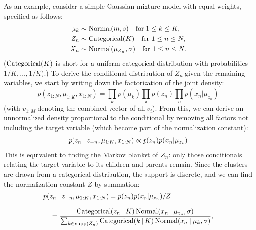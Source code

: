 As an example, consider a simple Gaussian mixture model with equal weights, specified as follows:
\begin{equation}
  \label{eq:normal-mixture-1}
  \begin{aligned}
    \mu_{k} &\sim \mathrm{Normal}(m, s) \quad\text{for } 1 \le k \le K, \\
    Z_{n} &\sim \mathrm{Categorical}(K) \quad\text{for } 1 \le n \le N, \\
    X_{n} &\sim \mathrm{Normal}(\mu_{Z_{n}}, \sigma) \quad\text{for } 1 \le n \le N.
  \end{aligned}
\end{equation}
(\(\mathrm{Categorical}(K)\) is short for a uniform categorical distribution with probabilities
\(1/K, \ldots, 1/K)\).)  To derive the conditional distribution of \(Z_{n}\) given the remaining
variables, we start by writing down the factorization of the joint density:
\begin{equation}
  p(z_{1:N}, \mu_{1:K}, x_{1:N}) = \prod_{k} p(\mu_{k}) \prod_{n} p(z_{n}) \prod_{n} p(x_{n} | \mu_{z_{n}})
\end{equation}
(with \(v_{1:M}\) denoting the combined vector of all \(v_{i}\)). From this, we can derive an
unnormalized density proportional to the conditional by removing all factors not including the
target variable (which become part of the normalization constant):
\begin{equation}
    p(z_{n} \:\vert\: z_{-n}, \mu_{1:K}, x_{1:N}) \propto p(z_{n}) p(x_{n} | \mu_{z_{n}})
\end{equation}
This is equivalent to finding the Markov blanket of \(Z_{n}\): only those conditionals relating the
target variable to its children and parents remain.  Since the clusters are drawn from a categorical
distribution, the support is discrete, and we can find the normalization constant \(Z\) by
summation:
\begin{equation}
  \setlength{\jot}{0.8\baselineskip}
  \begin{aligned}
    &p(z_{n} \given z_{-n}, \mu_{1:K}, x_{1:N}) = p(z_{n}) p(x_{n} | \mu_{z_{n}}) / Z  \\
    &\quad = \dfrac{\distr{Categorical}(z_{n} \given K) \, \Normal(x_{n} \given \mu_{z_{n}}, \sigma)}{
      \sum_{k \in\, \supp(Z_{n})} \distr{Categorical}(k \given K)\, \Normal(x_{n} \given \mu_{k},
      \sigma)}, \\
  \end{aligned}
\end{equation}
